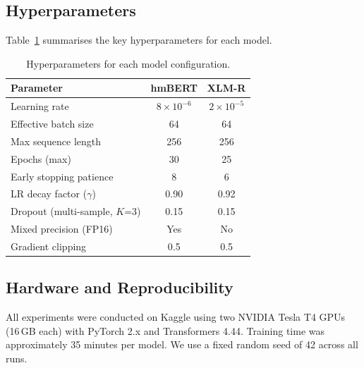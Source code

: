 \documentclass[runningheads]{llncs}
\begin{document}
\subsection{Hyperparameters}

Table~\ref{tab:hyper} summarises the key hyperparameters for each model.

\begin{table}[t]
\centering
\caption{Hyperparameters for each model configuration.}
\label{tab:hyper}
\begin{tabular}{lcc}
\toprule
\textbf{Parameter} & \textbf{hmBERT} & \textbf{XLM-R} \\
\midrule
Learning rate & $8 \times 10^{-6}$ & $2 \times 10^{-5}$ \\
Effective batch size & 64 & 64 \\
Max sequence length & 256 & 256 \\
Epochs (max) & 30 & 25 \\
Early stopping patience & 8 & 6 \\
LR decay factor ($\gamma$) & 0.90 & 0.92 \\
Dropout (multi-sample, $K$=3) & 0.15 & 0.15 \\
Mixed precision (FP16) & Yes & No \\
Gradient clipping & 0.5 & 0.5 \\
\bottomrule
\end{tabular}
\end{table}

\subsection{Hardware and Reproducibility}

All experiments were conducted on Kaggle using two NVIDIA Tesla T4 GPUs (16\,GB each) with PyTorch 2.x and Transformers 4.44. Training time was approximately 35 minutes per model. We use a fixed random seed of 42 across all runs.

\end{document}
